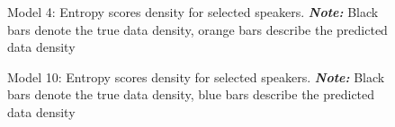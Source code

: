 \documentclass[
  authoryear,
  preprint,
  1p]{elsarticle}
\begin{document}
\label{cell-fig-rq1-pred-speaker_model04}
\begin{figure}[H]


\caption{\label{fig-rq1-pred-speaker_model04}Model 4: Entropy scores
density for selected speakers. \textbf{\emph{Note:}} Black bars denote
the true data density, orange bars describe the predicted data density}

\end{figure}%

\label{cell-fig-rq1-pred-speaker_model10}
\begin{figure}[H]


\caption{\label{fig-rq1-pred-speaker_model10}Model 10: Entropy scores
density for selected speakers. \textbf{\emph{Note:}} Black bars denote
the true data density, blue bars describe the predicted data density}

\end{figure}%
\end{document}
